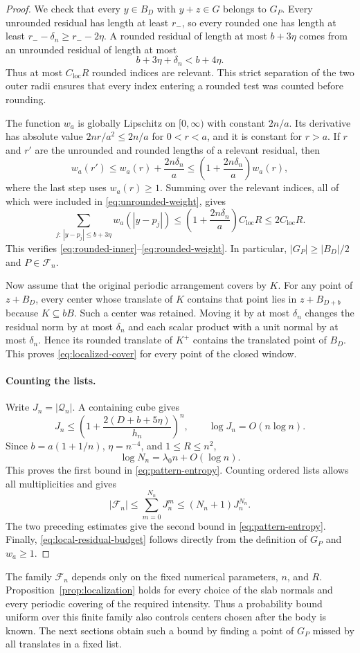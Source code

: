 \begin{proof}
We check that every $y\in B_D$ with $y+z\in G$ belongs to $G_P$.
Every unrounded residual has length at least $r_-$, so every rounded one
has length at least $r_--\delta_n\ge r_--2\eta$.
A rounded residual of length at most $b+3\eta$ comes from an unrounded
residual of length at most
\[
 b+3\eta+\delta_n<b+4\eta.
\]
Thus at most $C_{\mathrm{loc}}R$ rounded indices are relevant.  This
strict separation of the two outer radii ensures that every index entering
a rounded test was counted before rounding.

The function $w_a$ is globally Lipschitz on $[0,\infty)$ with constant
$2n/a$.  Its derivative has absolute value $2nr/a^2\le2n/a$ for
$0<r<a$, and it is constant for $r>a$.  If $r$ and $r'$ are the
unrounded and rounded lengths of a relevant residual, then
\[
 w_a(r')\le w_a(r)+\frac{2n\delta_n}{a}
          \le\left(1+\frac{2n\delta_n}{a}\right)w_a(r),
\]
where the last step uses $w_a(r)\ge1$.  Summing over the relevant indices,
all of which were included in \eqref{eq:unrounded-weight}, gives
\[
 \sum_{j:\,|y-p_j|\le b+3\eta}w_a(|y-p_j|)
 \le\left(1+\frac{2n\delta_n}{a}\right)C_{\mathrm{loc}}R
 \le2C_{\mathrm{loc}}R.
\]
This verifies \eqref{eq:rounded-inner}--\eqref{eq:rounded-weight}.
In particular, $|G_P|\ge|B_D|/2$ and $P\in\mathcal F_n$.

Now assume that the original periodic arrangement covers by $K$.
For any point of $z+B_D$, every center whose translate of $K$ contains
that point lies in $z+B_{D+b}$ because $K\subseteq bB$.  Such a center was
retained.  Moving it by at most $\delta_n$ changes the residual norm by at
most $\delta_n$ and each scalar product with a unit normal by at most
$\delta_n$.  Hence its rounded translate of $K^+$ contains the translated
point of $B_D$.  This proves \eqref{eq:localized-cover} for every point of
the closed window.

\paragraph{Counting the lists.}
Write $J_n=|\mathcal Q_n|$.  A containing cube gives
\[
 J_n\le\left(1+\frac{2(D+b+5\eta)}{h_n}\right)^n,
 \qquad \log J_n=O(n\log n).
\]
Since $b=a(1+1/n)$, $\eta=n^{-4}$, and $1\le R\le n^2$,
\[
 \log N_n=\lambda_0n+O(\log n).
\]
This proves the first bound in \eqref{eq:pattern-entropy}.  Counting ordered
lists allows all multiplicities and gives
\[
 |\mathcal F_n|\le\sum_{m=0}^{N_n}J_n^m
       \le(N_n+1)J_n^{N_n}.
\]
The two preceding estimates give the second bound in
\eqref{eq:pattern-entropy}.
Finally, \eqref{eq:local-residual-budget} follows directly from the
definition of $G_P$ and $w_a\ge1$.
\end{proof}

The family $\mathcal F_n$ depends only on the fixed numerical parameters,
$n$, and $R$.  Proposition~\ref{prop:localization} holds for every choice
of the slab normals and every periodic covering of the required intensity.
Thus a probability bound uniform over this finite family also controls
centers chosen after the body is known.  The next sections obtain such a
bound by finding a point of $G_P$ missed by all translates in a fixed list.
